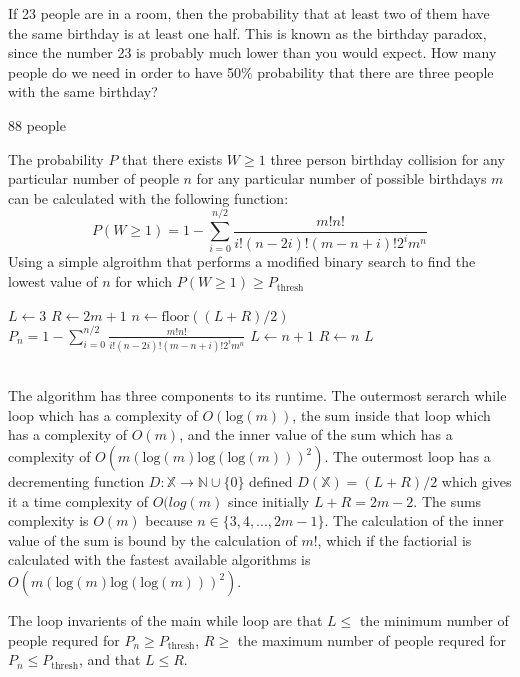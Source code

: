 \documentclass{article}
\author{Group: 7}
\date{due: 18 October 2019}
\newcommand{\N}{\mathbb{N}}
\begin{document}
\nextprob
If 23 people are in a room, then the probability that at least two of them have
the same birthday is at least one half.  This is known as the birthday paradox,
since the number 23 is probably much lower than you would expect.  How many
people do we need in order to have 50\% probability that there are three people
with the same birthday?

88 people

The probability $P$ that there exists $W \geq 1$ three person birthday collision for any particular number of people $n$ for any particular number of possible birthdays $m$ can be calculated with the following function:
$$P(W \geq 1) = 1 - \sum^{n/2}_{i=0} \frac{m!n!}{i!(n-2i)!(m-n+i)!2^i m^n }$$
Using a simple algroithm that performs a modified binary search to find the lowest value of $n$ for which    $P(W \geq 1) \geq  P_{\text{thresh}}$
    \begin{algorithm}
    \begin{algorithmic}
		\State $L \gets 3$		
		\State $R \gets 2m+1$
			\State $n \gets \text{floor}((L + R) / 2)$
			\State $\displaystyle P_n = 1 - \sum^{n/2}_{i=0} \frac{m!n!}{i!(n-2i)!(m-n+i)!2^i m^n }$
				\State	$L \gets n + 1$
				\State $R \gets n$
			\EndIf
		\EndWhile
		\State\Return $L$
	\EndProcedure
	\end{algorithmic}
    \end{algorithm}\\
The algorithm has three components to its runtime. The outermost serarch while loop which has a complexity of $O(\text{log}(m))$, the sum inside that loop which has a complexity of $O(m)$, and the inner value of the sum which has a complexity of $O(m(\text{log}(m)\text{log}(\text{log}(m)))^2 )$. The outermost loop has a decrementing function $D \colon \mathbb{X} \to \N \cup \{0\}$ defined $D( \mathbb{X}) = (L+R)/2 $ which gives it a time complexity of $O(log(m)$ since initially $L + R = 2m - 2$. The sums complexity is $O(m)$ because $n \in \{3,4,...,2m-1\}$. The calculation of the inner value of the sum is bound by the calculation of $m!$, which if the factiorial is calculated with the fastest available algorithms is $O(m(\text{log}(m)\text{log}(\text{log}(m)))^2 )$.

The loop invarients of the main while loop are that $L \leq $ the minimum number of people requred for $P_n \geq P_{\text{thresh}}$, $R \geq $ the maximum number of people requred for $P_n \leq P_{\text{thresh}}$, and that $L \leq R$.
\end{document}
